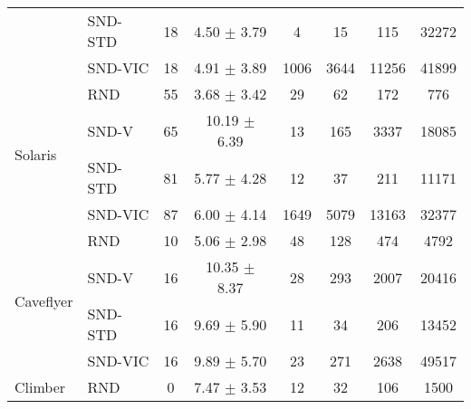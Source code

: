 \documentclass[a4paper,11pt]{elsarticle}
\begin{document}
\begin{table}[t!]
\begin{tabular}{l|l|cccccc}
& \multicolumn{1}{l|}{SND-STD} & \multicolumn{1}{c}{18} & \multicolumn{1}{c}{4.50 $\pm$ 3.79} & \multicolumn{1}{c}{4} & \multicolumn{1}{c}{15} & \multicolumn{1}{c}{115} & \multicolumn{1}{c}{32272} \\
& \multicolumn{1}{l|}{SND-VIC} & \multicolumn{1}{c}{18} & \multicolumn{1}{c}{4.91 $\pm$ 3.89} & \multicolumn{1}{c}{1006} & \multicolumn{1}{c}{3644} & \multicolumn{1}{c}{11256} & \multicolumn{1}{c}{41899} \\
\hline \multirow{4}{*}{Solaris}
& \multicolumn{1}{l|}{RND} & \multicolumn{1}{c}{55} & \multicolumn{1}{c}{3.68 $\pm$ 3.42} & \multicolumn{1}{c}{29} & \multicolumn{1}{c}{62} & \multicolumn{1}{c}{172} & \multicolumn{1}{c}{776} \\
& \multicolumn{1}{l|}{SND-V} & \multicolumn{1}{c}{65} & \multicolumn{1}{c}{10.19 $\pm$ 6.39} & \multicolumn{1}{c}{13} & \multicolumn{1}{c}{165} & \multicolumn{1}{c}{3337} & \multicolumn{1}{c}{18085} \\
& \multicolumn{1}{l|}{SND-STD} & \multicolumn{1}{c}{81} & \multicolumn{1}{c}{5.77 $\pm$ 4.28} & \multicolumn{1}{c}{12} & \multicolumn{1}{c}{37} & \multicolumn{1}{c}{211} & \multicolumn{1}{c}{11171} \\
& \multicolumn{1}{l|}{SND-VIC} & \multicolumn{1}{c}{87} & \multicolumn{1}{c}{6.00 $\pm$ 4.14} & \multicolumn{1}{c}{1649} & \multicolumn{1}{c}{5079} & \multicolumn{1}{c}{13163} & \multicolumn{1}{c}{32377} \\
\hline\hline
\multirow{4}{*}{Caveflyer}
& \multicolumn{1}{l|}{RND} & \multicolumn{1}{c}{10} & \multicolumn{1}{c}{5.06 $\pm$ 2.98} & \multicolumn{1}{c}{48} & \multicolumn{1}{c}{128} & \multicolumn{1}{c}{474} & \multicolumn{1}{c}{4792} \\
& \multicolumn{1}{l|}{SND-V} & \multicolumn{1}{c}{16} & \multicolumn{1}{c}{10.35 $\pm$ 8.37} & \multicolumn{1}{c}{28} & \multicolumn{1}{c}{293} & \multicolumn{1}{c}{2007} & \multicolumn{1}{c}{20416} \\
& \multicolumn{1}{l|}{SND-STD} & \multicolumn{1}{c}{16} & \multicolumn{1}{c}{9.69 $\pm$ 5.90} & \multicolumn{1}{c}{11} & \multicolumn{1}{c}{34} & \multicolumn{1}{c}{206} & \multicolumn{1}{c}{13452} \\
& \multicolumn{1}{l|}{SND-VIC} & \multicolumn{1}{c}{16} & \multicolumn{1}{c}{9.89 $\pm$ 5.70} & \multicolumn{1}{c}{23} & \multicolumn{1}{c}{271} & \multicolumn{1}{c}{2638} & \multicolumn{1}{c}{49517} \\
\hline \multirow{4}{*}{Climber}
& \multicolumn{1}{l|}{RND} & \multicolumn{1}{c}{0} & \multicolumn{1}{c}{7.47 $\pm$ 3.53} & \multicolumn{1}{c}{12} & \multicolumn{1}{c}{32} & \multicolumn{1}{c}{106} & \multicolumn{1}{c}{1500} \\

\end{tabular}
\end{table}
\end{document}
